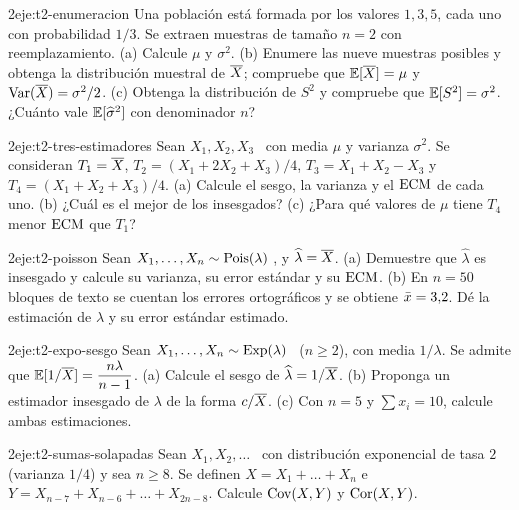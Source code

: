 \begin{ejercicio}{2}{eje:t2-enumeracion}
Una población está formada por los valores $1,3,5$, cada uno con probabilidad $1/3$. Se extraen muestras de tamaño $n=2$ con reemplazamiento. (a) Calcule $\mu$ y $\sigma^{2}$. (b) Enumere las nueve muestras posibles y obtenga la distribución muestral de $\overline{X}$; compruebe que $\mathbb{E}[\overline{X}]=\mu$ y $\operatorname{Var}(\overline{X})=\sigma^{2}/2$. (c) Obtenga la distribución de $S^{2}$ y compruebe que $\mathbb{E}[S^{2}]=\sigma^{2}$. ¿Cuánto vale $\mathbb{E}[\widehat\sigma^{2}]$ con denominador $n$?
\end{ejercicio}

\begin{ejercicio}{2}{eje:t2-tres-estimadores}
Sean $X_1,X_2,X_3$ \iid\ con media $\mu$ y varianza $\sigma^{2}$. Se consideran $T_1=\overline{X}$, $T_2=(X_1+2X_2+X_3)/4$, $T_3=X_1+X_2-X_3$ y $T_4=(X_1+X_2+X_3)/4$. (a) Calcule el sesgo, la varianza y el $\operatorname{ECM}$ de cada uno. (b) ¿Cuál es el mejor de los insesgados? (c) ¿Para qué valores de $\mu$ tiene $T_4$ menor $\operatorname{ECM}$ que $T_1$?
\end{ejercicio}

\begin{ejercicio}{2}{eje:t2-poisson}
Sean $X_1,\dots,X_n\sim\operatorname{Pois}(\lambda)$ \iid, y $\widehat\lambda=\overline{X}$. (a) Demuestre que $\widehat\lambda$ es insesgado y calcule su varianza, su error estándar y su $\operatorname{ECM}$. (b) En $n=50$ bloques de texto se cuentan los errores ortográficos y se obtiene $\bar{x}=3{,}2$. Dé la estimación de $\lambda$ y su error estándar estimado.
\end{ejercicio}

\begin{ejercicio}{2}{eje:t2-expo-sesgo}
Sean $X_1,\dots,X_n\sim\operatorname{Exp}(\lambda)$ \iid\ ($n\ge2$), con media $1/\lambda$. Se admite que $\mathbb{E}[1/\overline{X}]=\dfrac{n\lambda}{n-1}$. (a) Calcule el sesgo de $\widehat\lambda=1/\overline{X}$. (b) Proponga un estimador insesgado de $\lambda$ de la forma $c/\overline{X}$. (c) Con $n=5$ y $\sum x_i=10$, calcule ambas estimaciones.
\end{ejercicio}

\begin{ejercicio}{2}{eje:t2-sumas-solapadas}
Sean $X_1,X_2,\dots$ \iid\ con distribución exponencial de tasa $2$ (varianza $1/4$) y sea $n\ge8$. Se definen $X=X_1+\dots+X_n$ e $Y=X_{n-7}+X_{n-6}+\dots+X_{2n-8}$. Calcule $\operatorname{Cov}(X,Y)$ y $\operatorname{Cor}(X,Y)$.
\end{ejercicio}

